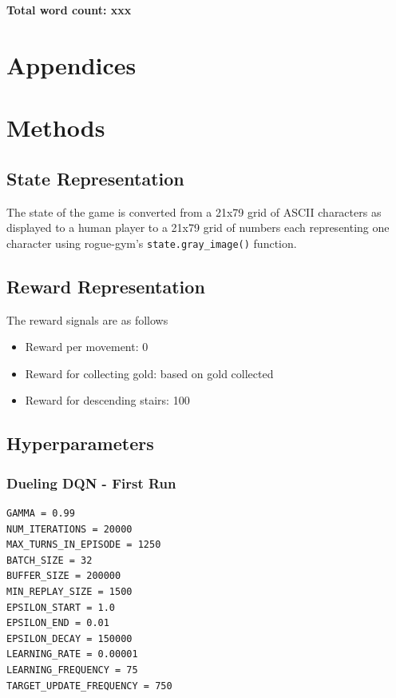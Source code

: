 \documentclass[12pt,a4paper]{article}
\begin{document}

    \textbf{Total word count: xxx}
    \medskip

    
    

    \medskip

    \appendix
    \section*{Appendices}
    \section{Methods}\label{sec:methods}

    \subsection{State Representation}\label{subsec:state-representation}
    The state of the game is converted from a 21x79 grid of ASCII characters as displayed to a human player to a 21x79 grid of
    numbers each representing one character using rogue-gym's \texttt{state.gray\_image()} function.

    \subsection{Reward Representation}\label{subsec:reward-representation}
    The reward signals are as follows
    \begin{itemize}
        \item Reward per movement: 0
        \item Reward for collecting gold: based on gold collected
        \item Reward for descending stairs: 100
    \end{itemize}

    \subsection{Hyperparameters}\label{subsec:hyperparameters}
    \subsubsection{Dueling DQN - First Run}
    \begin{lstlisting}[label={lst:ddqnhyperparameters}]
GAMMA = 0.99
NUM_ITERATIONS = 20000
MAX_TURNS_IN_EPISODE = 1250
BATCH_SIZE = 32
BUFFER_SIZE = 200000
MIN_REPLAY_SIZE = 1500
EPSILON_START = 1.0
EPSILON_END = 0.01
EPSILON_DECAY = 150000
LEARNING_RATE = 0.00001
LEARNING_FREQUENCY = 75
TARGET_UPDATE_FREQUENCY = 750
    \end{lstlisting}
\end{document}
